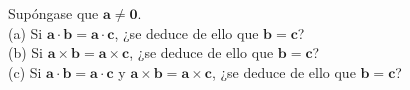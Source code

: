 \item Supóngase que $\mathbf{a} \neq \mathbf{0}$. \\
    (a) Si $\mathbf{a} \cdot \mathbf{b} = \mathbf{a} \cdot \mathbf{c}$, ¿se deduce de ello que $\mathbf{b} = \mathbf{c}$? \\
    (b) Si $\mathbf{a} \times \mathbf{b} = \mathbf{a} \times \mathbf{c}$, ¿se deduce de ello que $\mathbf{b} = \mathbf{c}$? \\
    (c) Si $\mathbf{a} \cdot \mathbf{b} = \mathbf{a} \cdot \mathbf{c}$ y $\mathbf{a} \times \mathbf{b} = \mathbf{a} \times \mathbf{c}$, ¿se deduce de ello que $\mathbf{b} = \mathbf{c}$?
